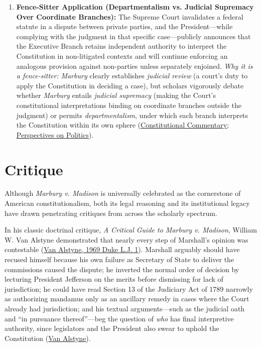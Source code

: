 \documentclass[12pt]{article}
\begin{document}
\begin{enumerate}
\item \textbf{Fence-Sitter Application (Departmentalism vs. Judicial Supremacy Over Coordinate Branches):} The Supreme Court invalidates a federal statute in a dispute between private parties, and the President---while complying with the judgment in that specific case---publicly announces that the Executive Branch retains independent authority to interpret the Constitution in non-litigated contexts and will continue enforcing an analogous provision against non-parties unless separately enjoined. \textit{Why it is a fence-sitter:} \textit{Marbury} clearly establishes \textit{judicial review} (a court's duty to apply the Constitution in deciding a case), but scholars vigorously debate whether \textit{Marbury} entails \textit{judicial supremacy} (making the Court's constitutional interpretations binding on coordinate branches outside the judgment) or permits \textit{departmentalism}, under which each branch interprets the Constitution within its own sphere (\href{https://scholarship.law.umn.edu/cgi/viewcontent.cgi?article=1616&context=concomm}{Constitutional Commentary}; \href{https://www.cambridge.org/core/journals/perspectives-on-politics/article/reconsidering-judicial-supremacy-from-the-countermajoritarian-difficulty-to-constitutional-transformations/441C07D9E0B84500BEC580C7C179341F}{Perspectives on Politics}).
\end{enumerate}

\section{Critique}

Although \textit{Marbury v. Madison} is universally celebrated as the cornerstone of American constitutionalism, both its legal reasoning and its institutional legacy have drawn penetrating critiques from across the scholarly spectrum.

In his classic doctrinal critique, \textit{A Critical Guide to Marbury v. Madison}, William W. Van Alstyne demonstrated that nearly every step of Marshall's opinion was contestable (\href{https://scholarship.law.duke.edu/dlj/vol18/iss1/1/}{Van Alstyne, 1969 Duke L.J. 1}). Marshall arguably should have recused himself because his own failure as Secretary of State to deliver the commissions caused the dispute; he inverted the normal order of decision by lecturing President Jefferson on the merits before dismissing for lack of jurisdiction; he could have read Section 13 of the Judiciary Act of 1789 narrowly as authorizing mandamus only as an ancillary remedy in cases where the Court already had jurisdiction; and his textual arguments---such as the judicial oath and ``in pursuance thereof''---beg the question of \textit{who} has final interpretive authority, since legislators and the President also swear to uphold the Constitution (\href{https://scholarship.law.duke.edu/dlj/vol18/iss1/1/}{Van Alstyne}).
\end{document}
